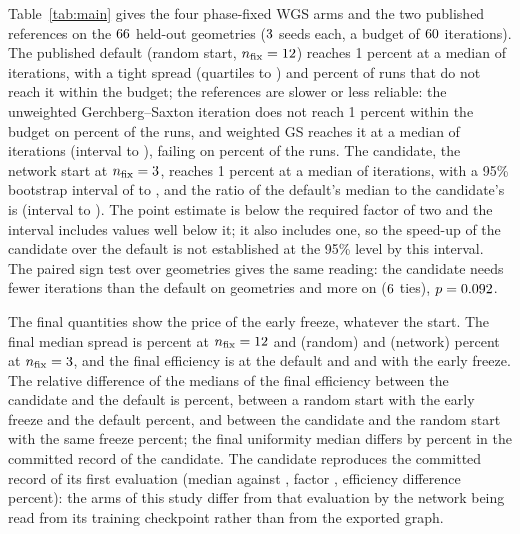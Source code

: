 Table~\ref{tab:main} gives the four phase-fixed WGS arms and the two published references on the $\nGeo$ held-out geometries ($3$ seeds each, a budget of $60$ iterations). The published default (random start, $n_{\mathrm{fix}}=12$) reaches 1 percent at a median of \itRTwelve{} iterations, with a tight spread (quartiles \itRTwelveQa{} to \itRTwelveQb) and \neverRTwelve{} percent of runs that do not reach it within the budget; the references are
slower or less reliable: the unweighted Gerchberg--Saxton iteration does not reach 1 percent within the budget on \neverMFour{} percent of the runs, and weighted GS reaches it at a median of \itMSix{} iterations (interval \itMSixLo{} to \itMSixHi), failing on \neverMSix{} percent of the runs. The candidate, the network start at $n_{\mathrm{fix}}=3$, reaches 1 percent at a median of \itNThree{} iterations, with a 95\% bootstrap interval of \itNThreeLo{} to \itNThreeHi{}, and the ratio of the default's median to the candidate's is \ratioRoverN{} (interval \ratioRoverNLo{} to \ratioRoverNHi). The point estimate is below the required factor of two and the interval
includes values well below it; it also includes one, so the speed-up of the candidate over the default is not established at the 95\% level by this interval. The paired sign test over geometries gives the same reading: the candidate needs fewer iterations than the default on \signARN{} geometries and more on \signBRN{} ($6$ ties), $p=0.092$.

\begin{table}[t]
\centering\small
\resizebox{\textwidth}{!}{}
\caption{Iterations to a relative standard deviation of 1\% on the $\nGeo$ held-out geometries: median over geometries with a bootstrap 95\% interval, quartiles, the share of runs that never reach 1\% within \budget{} iterations, the median final spread $\relstd$ in percent and the median final efficiency, for the four arms of phase-fixed WGS and two published references from the random start.}
\label{tab:main}
\end{table}

The final quantities show the price of the early freeze, whatever the start. The final median spread is \finRTwelve{} percent at $n_{\mathrm{fix}}=12$ and \finRThree{} (random) and \finNThree{} (network) percent at $n_{\mathrm{fix}}=3$, and the final efficiency is \effmRTwelve{} at the default and \effmRThree{} and \effmNThree{} with the early freeze. The relative difference of the medians of the final efficiency between the candidate and the default is \effdNThree{} percent, between a random start with
the early freeze and the default \effdRThree{} percent, and between the candidate and the random start with the same freeze \effdNThreeRThree{} percent; the final uniformity median differs by \recUni{} percent in the committed record of the candidate. The candidate reproduces the committed record of its first evaluation (median \recMedModel{} against \recMedRandom{}, factor \recRatio{}, efficiency difference \recEff{} percent): the arms of this study differ from that evaluation by the network being read from its training checkpoint rather than from the exported graph.

